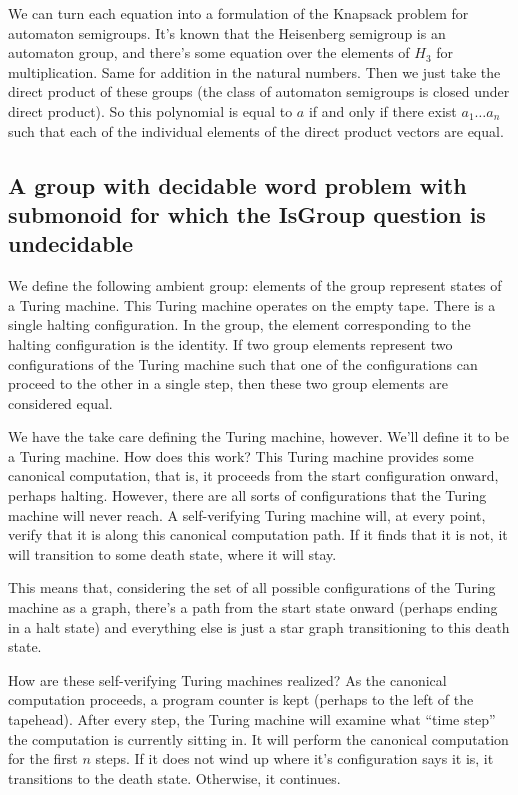 \documentclass[10pt]{article}
\begin{document}
We can turn each equation into a formulation of the Knapsack problem
for automaton semigroups. It's known that the Heisenberg semigroup is
an automaton group, and there's some equation over the elements of
$H_3$ for multiplication. Same for addition in the natural
numbers. Then we just take the direct product of these groups (the
class of automaton semigroups is closed under direct product). So this
polynomial is equal to $a$ if and only if there exist $a_1 \ldots a_n$
such that each of the individual elements of the direct product
vectors are equal.

\subsection{A group with decidable word problem with submonoid for
  which the IsGroup question is undecidable}

We define the following ambient group: elements of the group represent
states of a Turing machine. This Turing machine operates on the empty
tape. There is a single halting configuration. In the group, the
element corresponding to the halting configuration is the identity. If
two group elements represent two configurations of the Turing machine
such that one of the configurations can proceed to the other in a
single step, then these two group elements are considered equal.

We have the take care defining the Turing machine, however. We'll
define it to be a  Turing machine. How does this
work? This Turing machine provides some canonical computation, that
is, it proceeds from the start configuration onward, perhaps
halting. However, there are all sorts of configurations that the
Turing machine will never reach. A self-verifying Turing machine will,
at every point, verify that it is along this canonical computation
path. If it finds that it is not, it will transition to some death
state, where it will stay.

This means that, considering the set of all possible configurations of
the Turing machine as a graph, there's a path from the start state
onward (perhaps ending in a halt state) and everything else is just a
star graph transitioning to this death state.

How are these self-verifying Turing machines realized? As the
canonical computation proceeds, a program counter is kept (perhaps to
the left of the tapehead). After every step, the Turing machine will
examine what ``time step'' the computation is currently sitting in. It
will perform the canonical computation for the first $n$ steps. If it
does not wind up where it's configuration says it is, it transitions
to the death state. Otherwise, it continues.
\end{document}
